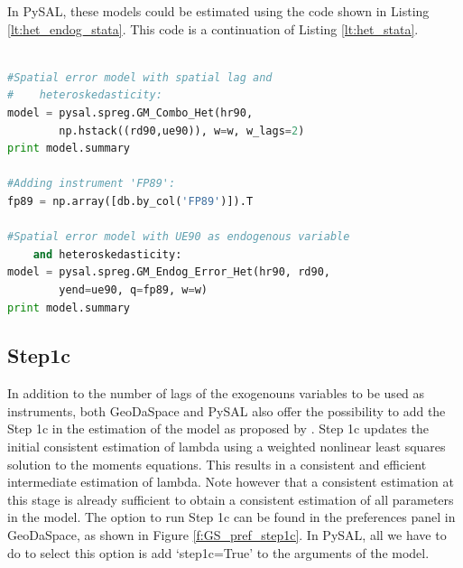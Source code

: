 \documentclass{article}
\begin{document}
In PySAL, these models could be estimated using the code shown in Listing \ref{lt:het_endog_stata}. This code is a continuation of Listing \ref{lt:het_stata}.

\begin{code}
\begin{lstlisting}[label=lt:het_endog_stata,caption=Using PySAL to match the results of spatial error models with heteroskedasticity and endogenous variables or spatial lag from Stata,language=Python]

#Spatial error model with spatial lag and
#    heteroskedasticity:
model = pysal.spreg.GM_Combo_Het(hr90,
        np.hstack((rd90,ue90)), w=w, w_lags=2)
print model.summary

#Adding instrument 'FP89':
fp89 = np.array([db.by_col('FP89')]).T

#Spatial error model with UE90 as endogenous variable
    and heteroskedasticity:
model = pysal.spreg.GM_Endog_Error_Het(hr90, rd90,
        yend=ue90, q=fp89, w=w)
print model.summary

\end{lstlisting}
\end{code}

\subsection{Step1c}
\label{s:step1c}
In addition to the number of lags of the exogenouns variables to be used as instruments, both GeoDaSpace and PySAL also offer the possibility to add the Step 1c in the estimation of the model as proposed by \citet{Arraiz10}. Step 1c updates the initial consistent estimation of lambda using a weighted nonlinear least squares solution to the moments equations. This results in a consistent and efficient intermediate estimation of lambda. Note however that a consistent estimation at this stage is already sufficient to obtain a consistent estimation of all parameters in the model. The option to run Step 1c can be found in the preferences panel in GeoDaSpace, as shown in Figure \ref{f:GS_pref_step1c}. In PySAL, all we have to do to select this option is add `step1c=True' to the arguments of the model.
\end{document}
